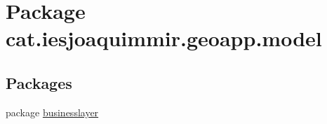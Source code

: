 \hypertarget{namespacecat_1_1iesjoaquimmir_1_1geoapp_1_1model}{}\section{Package cat.\+iesjoaquimmir.\+geoapp.\+model}
\label{namespacecat_1_1iesjoaquimmir_1_1geoapp_1_1model}
\subsection*{Packages}
\begin{DoxyCompactItemize}
\item 
package \mbox{\hyperlink{namespacecat_1_1iesjoaquimmir_1_1geoapp_1_1model_1_1businesslayer}{businesslayer}}
\end{DoxyCompactItemize}
